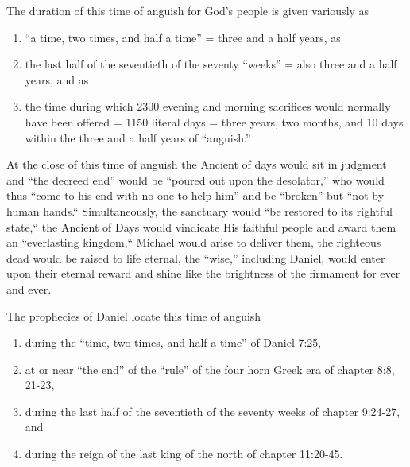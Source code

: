 The duration of this time of anguish for God's people is given variously as
\begin{enumerate}
    \item ``a time, two times, and half a time'' = three and a half years,
         as
    \item the last half of the seventieth of the seventy ``weeks'' = also three and a
        half years, and as 
    \item  the time during which 2300 evening and morning
sacrifices would normally have been offered = 1150 literal days = three
        years, two months, and 10 days within 
        the three and a half years of ``anguish.''
\end{enumerate}

At the close of this time of anguish the Ancient of days would sit in
judgment and ``the decreed end'' would be ``poured out upon the desolator,'' who
would thus ``come to his end with no one to help him'' and be ``broken'' but
``not by human hands.``
Simultaneously, the sanctuary would ``be restored to
its rightful state,`` the Ancient of Days would vindicate His faithful people
and award them an ``everlasting kingdom,`` Michael would arise to deliver
them, the righteous dead would be raised to life eternal, the ``wise,''
including Daniel, would enter upon their eternal reward and shine like the
brightness of the firmament for ever and ever.

The prophecies of Daniel locate this time of anguish 
\begin{enumerate}
    \item during the ``time,
two times, and half a time'' of Daniel 7:25, 
    \item at or near ``the end'' of the
``rule'' of the four horn Greek era of chapter 8:8, 21-23, 
    \item during the last
half of the seventieth of the seventy weeks of chapter 9:24-27, and 
    \item during the reign of the last king of the north of chapter 11:20-45. 
\end{enumerate}

